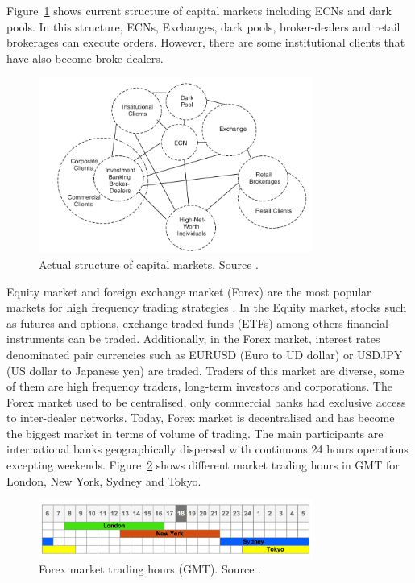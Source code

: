 Figure~\ref{fig:capitalmarketnow} shows current structure of capital markets
including ECNs and dark pools. In this structure, ECNs, Exchanges, dark pools,
broker-dealers and retail brokerages can execute orders. However, there are some
institutional clients that have also become broke-dealers.

\begin{figure}[!h]
  \centering
  \includegraphics[width=0.8\textwidth]{img/capitalmarketsnow}
  \caption[Actual structure of capital markets]{Actual structure of capital markets. Source \cite{aldridge2009}.}
  \label{fig:capitalmarketnow}
\end{figure}


Equity market and foreign exchange market (Forex) are the most popular markets
for high frequency trading strategies \cite{genccay2001introduction}. In the
Equity market, stocks such as futures and options, exchange-traded funds (ETFs)
among others financial instruments can be traded. Additionally, in the Forex
market, interest rates denominated pair currencies such as EURUSD (Euro to UD
dollar) or USDJPY (US dollar to Japanese yen) are traded. Traders of this
market are diverse, some of them are high frequency traders, long-term
investors and corporations. The Forex market used to be centralised, only
commercial banks had exclusive access to inter-dealer networks. Today, Forex
market is decentralised and has become the biggest market in terms of volume of
trading. The main participants are international banks geographically dispersed
with continuous 24 hours operations excepting weekends.
Figure~\ref{fig:Forextimes} shows different market trading hours in GMT for
London, New York, Sydney and Tokyo.

\begin{figure}[!h]
  \centering
  \includegraphics[width=0.8\textwidth]{img/forex-trading-hours.png}
  \caption[Forex market trading hours (GMT)]{Forex market trading hours (GMT). Source \cite{dailyprice}.}
  \label{fig:Forextimes}
\end{figure}



